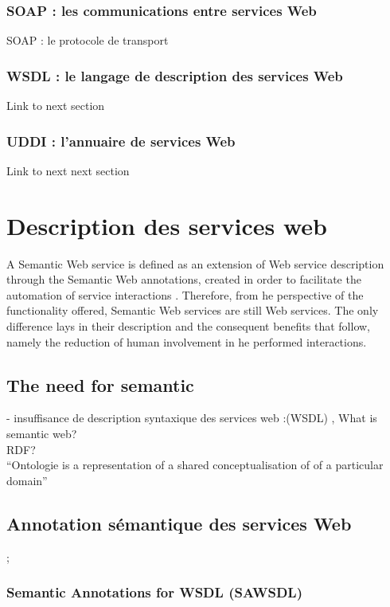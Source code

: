 	 \subsubsection{SOAP : les communications entre services Web } 
	     SOAP : le protocole de transport 
	 \subsubsection{WSDL : le langage de description des services Web}
	     Link to next section
	 \subsubsection{UDDI : l’annuaire de services Web }
	     Link to next next section

\section{Description des services web} 
    A Semantic Web service is defined as an extension of Web service description through the Semantic Web annotations,
    created in order to facilitate the automation of service interactions \cite{mcilraith2001semantic}. Therefore, from 
    he perspective of the functionality offered, Semantic Web services are still Web services. The only difference lays
    in their description and the consequent benefits that follow, namely the reduction of human involvement in 
    he performed interactions.\cite{vargas2009challenges}\\
    \subsection{The need for semantic}
	- insuffisance de description syntaxique des services web :(WSDL)
	\cite{decker2000semantic}, \cite{sivashanmugam2003adding} What is semantic web? \\
	 RDF? \cite{lassila1999resource}\\
	``Ontologie is a representation of a shared conceptualisation of of a particular domain'' 
	 \cite{decker2000semantic}\\

    \subsection{Annotation sémantique des services Web};
	 \subsubsection{Semantic Annotations for WSDL (SAWSDL) }
